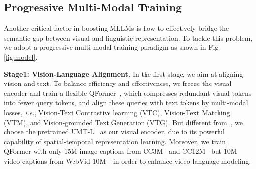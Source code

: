 \subsection{Progressive Multi-Modal Training}

Another critical factor in boosting MLLMs is how to effectively bridge the semantic gap between visual and linguistic representation.
To tackle this problem,
we adopt a progressive multi-modal training paradigm as shown in Fig. \ref{fig:model}.

\textbf{Stage1: Vision-Language Alignment.}
In the first stage,
we aim at aligning vision and text.
To balance efficiency and effectiveness,
we freeze the visual encoder and train a flexible QFormer~\cite{blip2},
which compresses redundant visual tokens into fewer query tokens,
and align these queries with text tokens by multi-modal losses,
\textit{i.e.},
Vision-Text Contrastive learning (VTC), 
Vision-Text Matching (VTM), 
and Vision-grounded Text Generation (VTG). 
But different from~\cite{blip2},
we choose the pretrained UMT-L~\cite{umt} as our visual encoder,
due to its powerful capability of spatial-temporal representation learning.
Moreover,
we train QFormer with only 15M image captions from CC3M~\cite{cc3m} and CC12M~\cite{cc12m} but 10M video captions from WebVid-10M~\cite{bain2021frozen},
in order to enhance video-language modeling.

